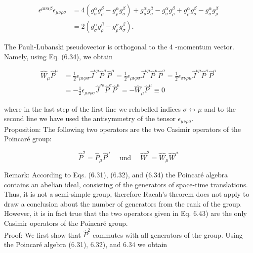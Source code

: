 \documentclass[10pt, letterpaper]{article}
\begin{document}
$$
\begin{aligned}
\epsilon^{\mu \nu \alpha \beta} \epsilon_{\mu \nu \rho \sigma} & =4\left(g_{\sigma}^{\alpha} g_{\rho}^{\beta}-g_{\rho}^{\alpha} g_{\sigma}^{\beta}\right)+g_{\rho}^{\alpha} g_{\sigma}^{\beta}-g_{\sigma}^{\alpha} g_{\rho}^{\beta}+g_{\rho}^{\alpha} g_{\sigma}^{\beta}-g_{\sigma}^{\alpha} g_{\rho}^{\beta} \\
& =2\left(g_{\sigma}^{\alpha} g_{\rho}^{\beta}-g_{\rho}^{\alpha} g_{\sigma}^{\beta}\right) .
\end{aligned}
$$

The Pauli-Lubanski pseudovector is orthogonal to the 4 -momentum vector. Namely, using Eq. (6.34), we obtain

$$
\begin{aligned}
\hat{W}_{\mu} \hat{P}^{\mu} & =\frac{1}{2} \epsilon_{\mu \nu \rho \sigma} \hat{J}^{\nu \rho} \hat{P}^{\sigma} \hat{P}^{\mu}=\frac{1}{2} \epsilon_{\mu \nu \rho \sigma} \hat{J}^{\nu \rho} \hat{P}^{\mu} \hat{P}^{\sigma}=\frac{1}{2} \epsilon_{\sigma \nu \rho \mu} \hat{J}^{\nu \rho} \hat{P}^{\sigma} \hat{P}^{\mu} \\
& =-\frac{1}{2} \epsilon_{\mu \nu \rho \sigma} \hat{J}^{\nu \rho} \hat{P}^{\sigma} \hat{P}^{\mu}=-\hat{W}_{\mu} \hat{P}^{\mu} \equiv 0
\end{aligned}
$$

where in the last step of the first line we relabelled indices $\sigma \leftrightarrow \mu$ and to the second line we have used the antisymmetry of the tensor $\epsilon_{\mu \nu \rho \sigma}$.\\
Proposition: The following two operators are the two Casimir operators of the Poincaré group:

$$
\hat{P}^{2}=\hat{P}_{\mu} \hat{P}^{\mu} \quad \text { und } \quad \hat{W}^{2}=\hat{W}_{\mu} \hat{W}^{\mu}
$$

Remark: According to Eqs. (6.31), (6.32), and (6.34) the Poincaré algebra contains an abelian ideal, consisting of the generators of space-time translations. Thus, it is not a semi-simple group, therefore Racah's theorem does not apply to draw a conclusion about the number of generators from the rank of the group. However, it is in fact true that the two operators given in Eq. 6.43) are the only Casimir operators of the Poincaré group.\\
Proof: We first show that $\hat{P}^{2}$ commutes with all generators of the group. Using the Poincaré algebra (6.31), 6.32), and 6.34 we obtain
\end{document}
